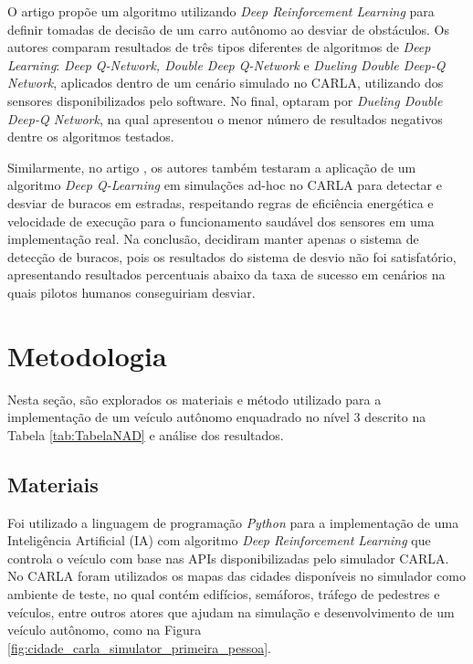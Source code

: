 \documentclass[a4paper,12pt,Times]{article}
\begin{document}
O artigo  propõe um algoritmo utilizando \textit{Deep Reinforcement Learning} para definir tomadas de decisão de um carro autônomo ao desviar de obstáculos. Os autores comparam resultados de três tipos diferentes de algoritmos de \textit{Deep Learning}: \textit{Deep Q-Network, Double Deep Q-Network} e \textit{Dueling Double Deep-Q Network}, aplicados dentro de um cenário simulado no CARLA, utilizando dos sensores disponibilizados pelo software. No final, optaram por \textit{Dueling Double Deep-Q Network}, na qual apresentou o menor número de resultados negativos dentre os algoritmos testados.

Similarmente, no artigo , os autores também testaram a aplicação de um algoritmo \textit{Deep Q-Learning} em simulações ad-hoc no CARLA para detectar e desviar de buracos em estradas, respeitando regras de eficiência energética e velocidade de execução para o funcionamento saudável dos sensores em uma implementação real. Na conclusão, decidiram manter apenas o sistema de detecção de buracos, pois os resultados do sistema de desvio não foi satisfatório, apresentando resultados percentuais abaixo da taxa de sucesso em cenários na quais pilotos humanos conseguiriam desviar.

\section{Metodologia}
Nesta seção, são explorados os materiais e método utilizado para a implementação de um veículo autônomo enquadrado no nível 3 descrito na Tabela \ref{tab:TabelaNAD} e análise dos resultados.

\subsection{Materiais}

Foi utilizado a linguagem de programação \textit{Python} para a implementação de uma Inteligência Artificial (IA) com algoritmo \textit{Deep Reinforcement Learning} que controla o veículo com base nas APIs disponibilizadas pelo simulador CARLA. No CARLA foram utilizados os mapas das cidades disponíveis no simulador como ambiente de teste, no qual contém edifícios, semáforos, tráfego  de pedestres e veículos, entre outros atores que ajudam na simulação e desenvolvimento de um veículo autônomo, como na Figura \ref{fig:cidade_carla_simulator_primeira_pessoa}.
\end{document}
